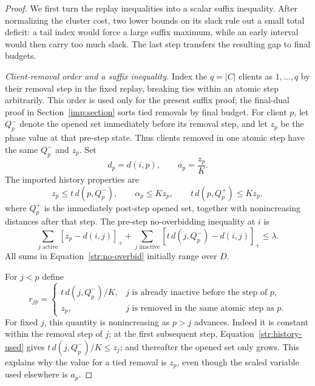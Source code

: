 \begin{proof}
We first turn the replay inequalities into a scalar suffix inequality.
After normalizing the cluster cost, two lower bounds on its slack
rule out a small total deficit: a tail index would force a large
suffix maximum, while an early interval would then carry too much
slack.  The last step transfers the resulting gap to final budgets.

\textit{Client-removal order and a suffix inequality.}
Index the $q=|C|$ clients as $1,\ldots,q$ by their removal step in the
fixed replay, breaking ties within an atomic step arbitrarily.  This order is used
only for the present suffix proof; the final-dual proof in
Section~\ref{imp:section} sorts tied removals by final budget.  For client
$p$, let $Q_p^-$ denote the opened set immediately before its removal
step, and let $z_p$ be the phase value at that pre-step state.  Thus
clients removed in one atomic step have the same $Q_p^-$ and $z_p$.
Set
\[
 d_p=d(i,p),\qquad a_p=\frac{z_p}{K}.
\]
The imported history properties are
\begin{equation}\label{str:history-used}
 z_p\le t\,d(p,Q_p^-),\qquad
 \alpha_p\le Kz_p,
 \qquad t\,d(p,Q_p^+)\le Kz_p,
\end{equation}
where $Q_p^+$ is the immediately post-step opened set, together with
nonincreasing distances after that step.  The pre-step no-overbidding
inequality at $i$ is
\begin{equation}\label{str:no-overbid}
 \sum_{j\text{ active}}[z_p-d(i,j)]_+
 +\sum_{j\text{ inactive}}[t\,d(j,Q_p^-)-d(i,j)]_+
 \le\lambda.
\end{equation}
All sums in Equation~\eqref{str:no-overbid} initially range over $D$.

For $j<p$ define
\[
 r_{jp}=
 \begin{cases}
 t\,d(j,Q_p^-)/K,&j\text{ is already inactive before the step of }p,\\
 z_p,&j\text{ is removed in the same atomic step as }p.
 \end{cases}
\]
For fixed $j$, this quantity is nonincreasing as $p>j$ advances.
Indeed it is constant within the removal step of $j$; at the first
subsequent step, Equation~\eqref{str:history-used} gives
$t\,d(j,Q_p^-)/K\le z_j$; and thereafter the opened set only grows.
This explains why the value for a tied removal is $z_p$, even though
the scaled variable used elsewhere is $a_p$.


\end{proof}
